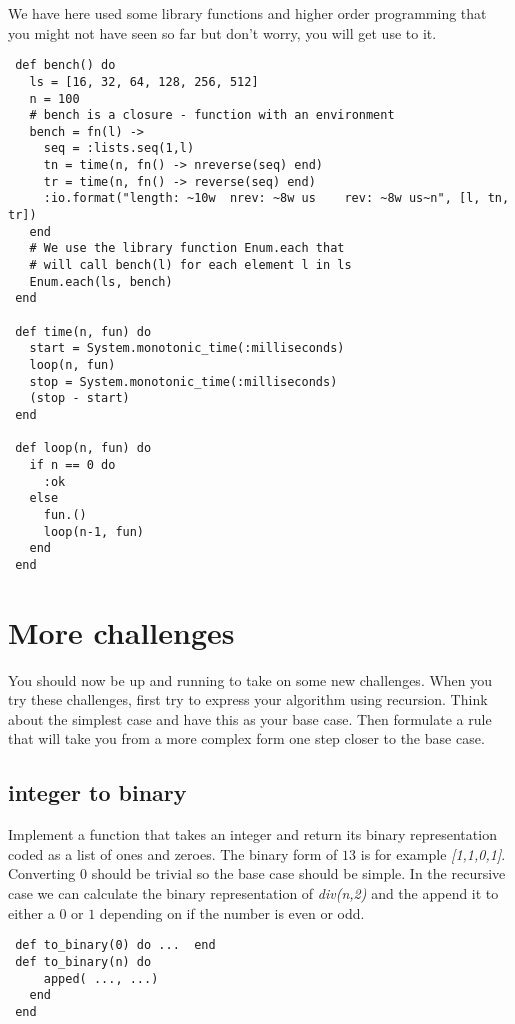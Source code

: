\documentclass[a4paper,11pt]{article}
\begin{document}
We have here used some library functions and higher order programming
that you might not have seen so far but don't worry, you will get use
to it. 


\begin{verbatim}
 def bench() do
   ls = [16, 32, 64, 128, 256, 512]
   n = 100
   # bench is a closure - function with an environment
   bench = fn(l) ->
     seq = :lists.seq(1,l)
     tn = time(n, fn() -> nreverse(seq) end)
     tr = time(n, fn() -> reverse(seq) end)
     :io.format("length: ~10w  nrev: ~8w us    rev: ~8w us~n", [l, tn, tr])
   end
   # We use the library function Enum.each that 
   # will call bench(l) for each element l in ls
   Enum.each(ls, bench)
 end

 def time(n, fun) do
   start = System.monotonic_time(:milliseconds)
   loop(n, fun)
   stop = System.monotonic_time(:milliseconds)
   (stop - start)
 end

 def loop(n, fun) do
   if n == 0 do
     :ok 
   else
     fun.()
     loop(n-1, fun) 
   end
 end
\end{verbatim}



\section{More challenges}

You should now be up and running to take on some new challenges. When
you try these challenges, first try to express your algorithm using
recursion. Think about the simplest case and have this as your base
case. Then formulate a rule that will take you from a more complex form
one step closer to the base case.

\subsection{integer to binary}

Implement a function that takes an integer and return its binary
representation coded as a list of ones and zeroes. The binary form of
$13$ is for example {\em [1,1,0,1]}. Converting $0$ should be trivial
so the base case should be simple. In the recursive case we can
calculate the binary representation of {\em div(n,2)} and the append
it to either a $0$ or $1$ depending on if the number is even or odd.

\begin{verbatim}
 def to_binary(0) do ...  end
 def to_binary(n) do
     apped( ..., ...)
   end
 end
\end{verbatim}
\end{document}
